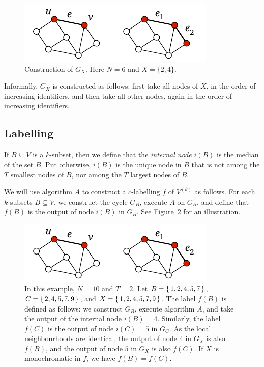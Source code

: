 \begin{figure}
    \centering
    \includegraphics[page=\PSubsetCycle]{figs.pdf}
    \caption{Construction of $G_X$. Here $N = 6$ and $X = \{2,4\}$.}\label{fig:subset-cycle}
\end{figure}

Informally, $G_X$ is constructed as follows: first take all nodes of $X$, in the order of increasing identifiers, and then take all other nodes, again in the order of increasing identifiers.


\subsection{Labelling}

If $B \subseteq V$ is a $k$-subset, then we define that the \emph{internal node} $i(B)$ is the median of the set $B$. Put otherwise, $i(B)$ is the unique node in $B$ that is not among the $T$ smallest nodes of $B$, nor among the $T$ largest nodes of $B$.

We will use algorithm $A$ to construct a $c$-labelling $f$ of $V^{(k)}$ as follows. For each $k$-subsets $B \subseteq V$, we construct the cycle $G_B$, execute $A$ on $G_B$, and define that $f(B)$ is the output of node $i(B)$ in $G_B$. See Figure~\ref{fig:colour-lb} for an illustration.

\begin{figure}
    \centering
    \includegraphics[page=\PColourLB]{figs.pdf}
    \caption{In this example, $N = 10$ and $T = 2$. Let $B = \{\, 1,2,4,5,7 \,\}$, $C = \{\, 2,4,5,7,9 \,\}$, and $X = \{\, 1,2,4,5,7,9 \,\}$. The label $f(B)$ is defined as follows: we construct $G_B$, execute algorithm $A$, and take the output of the internal node $i(B) = 4$. Similarly, the label $f(C)$ is the output of node $i(C) = 5$ in $G_C$. As the local neighbourhoods are identical, the output of node $4$ in $G_X$ is also $f(B)$, and the output of node $5$ in $G_X$ is also $f(C)$. If $X$ is monochromatic in $f$, we have $f(B) = f(C)$.}\label{fig:colour-lb}
\end{figure}


